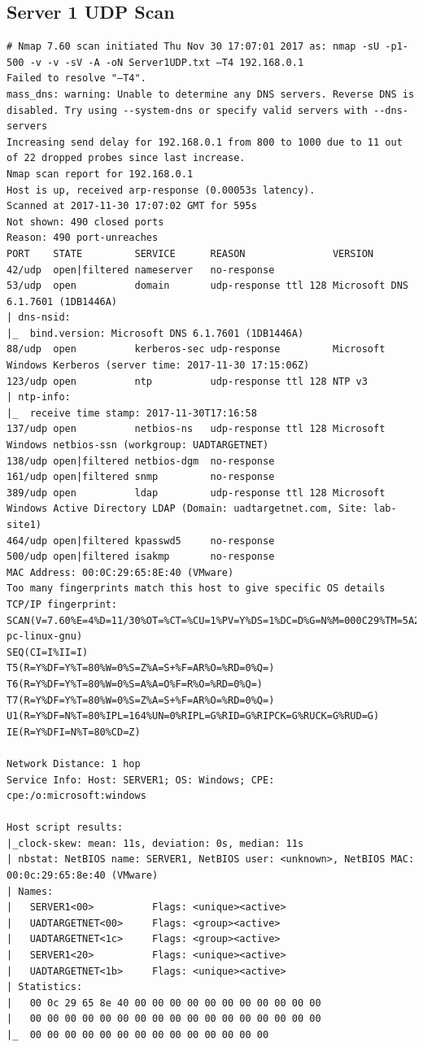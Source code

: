 \documentclass[12pt,a4paper]{article}
\begin{document}
\begin{appendices}
	\subsection{Server 1 UDP Scan}
		\begin{lstlisting}
# Nmap 7.60 scan initiated Thu Nov 30 17:07:01 2017 as: nmap -sU -p1-500 -v -v -sV -A -oN Server1UDP.txt –T4 192.168.0.1
Failed to resolve "–T4".
mass_dns: warning: Unable to determine any DNS servers. Reverse DNS is disabled. Try using --system-dns or specify valid servers with --dns-servers
Increasing send delay for 192.168.0.1 from 800 to 1000 due to 11 out of 22 dropped probes since last increase.
Nmap scan report for 192.168.0.1
Host is up, received arp-response (0.00053s latency).
Scanned at 2017-11-30 17:07:02 GMT for 595s
Not shown: 490 closed ports
Reason: 490 port-unreaches
PORT    STATE         SERVICE      REASON               VERSION
42/udp  open|filtered nameserver   no-response
53/udp  open          domain       udp-response ttl 128 Microsoft DNS 6.1.7601 (1DB1446A)
| dns-nsid:
|_  bind.version: Microsoft DNS 6.1.7601 (1DB1446A)
88/udp  open          kerberos-sec udp-response         Microsoft Windows Kerberos (server time: 2017-11-30 17:15:06Z)
123/udp open          ntp          udp-response ttl 128 NTP v3
| ntp-info:
|_  receive time stamp: 2017-11-30T17:16:58
137/udp open          netbios-ns   udp-response ttl 128 Microsoft Windows netbios-ssn (workgroup: UADTARGETNET)
138/udp open|filtered netbios-dgm  no-response
161/udp open|filtered snmp         no-response
389/udp open          ldap         udp-response ttl 128 Microsoft Windows Active Directory LDAP (Domain: uadtargetnet.com, Site: lab-site1)
464/udp open|filtered kpasswd5     no-response
500/udp open|filtered isakmp       no-response
MAC Address: 00:0C:29:65:8E:40 (VMware)
Too many fingerprints match this host to give specific OS details
TCP/IP fingerprint:
SCAN(V=7.60%E=4%D=11/30%OT=%CT=%CU=1%PV=Y%DS=1%DC=D%G=N%M=000C29%TM=5A203D09%P=i686-pc-linux-gnu)
SEQ(CI=I%II=I)
T5(R=Y%DF=Y%T=80%W=0%S=Z%A=S+%F=AR%O=%RD=0%Q=)
T6(R=Y%DF=Y%T=80%W=0%S=A%A=O%F=R%O=%RD=0%Q=)
T7(R=Y%DF=Y%T=80%W=0%S=Z%A=S+%F=AR%O=%RD=0%Q=)
U1(R=Y%DF=N%T=80%IPL=164%UN=0%RIPL=G%RID=G%RIPCK=G%RUCK=G%RUD=G)
IE(R=Y%DFI=N%T=80%CD=Z)

Network Distance: 1 hop
Service Info: Host: SERVER1; OS: Windows; CPE: cpe:/o:microsoft:windows

Host script results:
|_clock-skew: mean: 11s, deviation: 0s, median: 11s
| nbstat: NetBIOS name: SERVER1, NetBIOS user: <unknown>, NetBIOS MAC: 00:0c:29:65:8e:40 (VMware)
| Names:
|   SERVER1<00>          Flags: <unique><active>
|   UADTARGETNET<00>     Flags: <group><active>
|   UADTARGETNET<1c>     Flags: <group><active>
|   SERVER1<20>          Flags: <unique><active>
|   UADTARGETNET<1b>     Flags: <unique><active>
| Statistics:
|   00 0c 29 65 8e 40 00 00 00 00 00 00 00 00 00 00 00
|   00 00 00 00 00 00 00 00 00 00 00 00 00 00 00 00 00
|_  00 00 00 00 00 00 00 00 00 00 00 00 00 00


\end{lstlisting}
\end{appendices}
\end{document}
